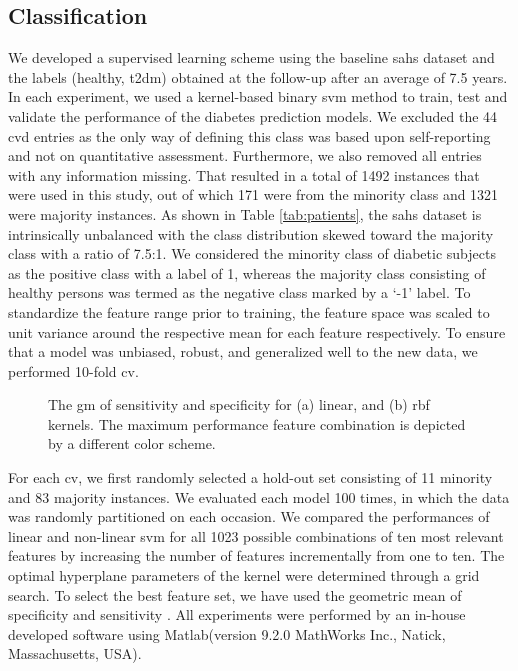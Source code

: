 \documentclass[journal,comsoc]{IEEEtran}
\renewcommand{\^}{\hat}  %
\begin{document}
\subsection{Classification}
%
We developed a supervised learning scheme using the baseline \ac{sahs} dataset and the labels (healthy, \ac{t2dm}) obtained at the follow-up after an average of \num{7.5} years. In each experiment, we used a kernel-based binary \ac{svm} method to train, test and validate the performance of the diabetes prediction models.  We excluded the \num{44} \ac{cvd} entries as the only way of defining this class was based upon self-reporting and not on quantitative assessment. Furthermore, we also removed all entries with any information missing. That resulted in a total of \num[group-minimum-digits=4, group-separator = {,}]{1492} instances that were used in this study, out of which \num{171} were from the minority class and \num[group-minimum-digits=4, group-separator = {,}]{1321} were majority instances. As shown in Table \ref{tab:patients}, the \ac{sahs} dataset is intrinsically unbalanced with the class distribution skewed toward the majority class with a ratio of 7.5:1. We considered the minority class of diabetic subjects as the positive class with a label of 1, whereas the majority class consisting of healthy persons was termed as the negative class marked by a `-1' label. To standardize the feature range prior to training, the feature space was scaled to unit variance around the respective mean for each feature respectively. To ensure that a model was unbiased, robust, and generalized well to the new data, we performed 10-fold \ac{cv}.

\begin{figure}[t!]
  \centering
  \caption{The \ac{gm} of sensitivity and specificity for (a) linear, and (b) \ac{rbf} kernels. The maximum performance feature combination is depicted by a different color scheme.}
  \label{fig:gmean}
\end{figure}
%
For each \ac{cv}, we first randomly selected a hold-out set consisting of \num{11} minority and \num{83} majority instances. We evaluated each model \num{100} times, in which the data was randomly partitioned on each occasion. We compared the performances of linear and non-linear \ac{svm} for all \num[group-minimum-digits=4, group-separator = {,}]{1023} possible combinations of ten most relevant features by increasing the number of features incrementally from one to ten. The optimal hyperplane parameters of the kernel were determined through a grid search. To select the best feature set, we have used the geometric mean of specificity and sensitivity \cite{kubat1997addressing}. All experiments were performed by an in-house developed software using Matlab\textregistered (version 9.2.0 MathWorks Inc., Natick, Massachusetts, USA).
%
%
\end{document}
